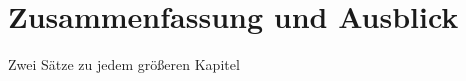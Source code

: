 \chapter{Zusammenfassung und Ausblick}\label{ch:zusammenfassung}

Zwei Sätze zu jedem größeren Kapitel



\begin{deprecated}
\cite{davis93}


\end{deprecated}
